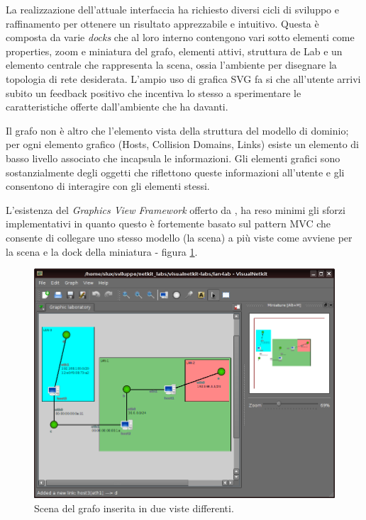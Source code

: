 La realizzazione dell'attuale interfaccia ha richiesto diversi cicli di sviluppo e raffinamento per ottenere un risultato apprezzabile e intuitivo. Questa è composta da varie \emph{docks} che al loro interno contengono vari sotto elementi come properties, zoom e miniatura del grafo, elementi attivi, struttura de Lab e un elemento centrale che rappresenta la scena, ossia l'ambiente per disegnare la topologia di rete desiderata. L'ampio uso di grafica SVG fa si che all'utente arrivi subito un feedback positivo che incentiva lo stesso a sperimentare le caratteristiche offerte dall'ambiente che ha davanti.

Il grafo non è altro che l'elemento vista della struttura del modello di dominio; per ogni elemento grafico (Hosts, Collision Domains, Links) esiste un elemento di basso livello associato che incapsula le informazioni. Gli elementi grafici sono sostanzialmente degli oggetti che riflettono queste informazioni all'utente e gli consentono di interagire con gli elementi stessi.

L'esistenza del \emph{Graphics View Framework} offerto da \qt{}, ha reso minimi gli sforzi implementativi in quanto questo è fortemente basato sul pattern MVC che consente di collegare uno stesso modello (la scena) a più viste come avviene per la scena e la dock della miniatura - figura \ref{figura:vnetkit_graphics_view_1}.

\begin{figure}[!htb]
	\centering
	\includegraphics[width=12cm]{images/visualnetkit_graphics_view_1.png}
	\caption{Scena del grafo inserita in due viste differenti.}
	\label{figura:vnetkit_graphics_view_1}
\end{figure}

